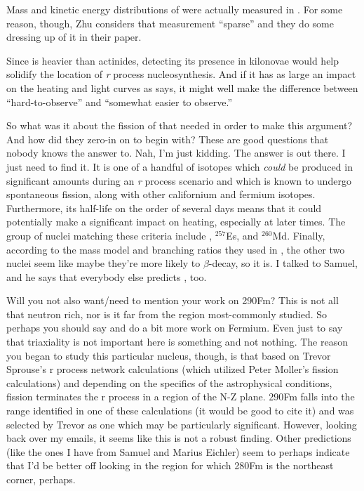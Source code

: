 Mass and kinetic energy distributions of {\Cf} were actually measured in \cite{Brandt1963}. For some reason, though, Zhu considers that measurement ``sparse'' and they do some dressing up of it in their paper.

Since {\Cf} is heavier than actinides, detecting its presence in kilonovae would help solidify the location of \textit{r} process nucleosynthesis. And if it has as large an impact on the heating and light curves as \cite{Zhu2018} says, it might well make the difference between ``hard-to-observe'' and ``somewhat easier to observe.''

So what was it about the fission of {\Cf} that \cite{Zhu2018} needed in order to make this argument? And how did they zero-in on {\Cf} to begin with? These are good questions that nobody knows the answer to. Nah, I'm just kidding. The answer is out there. I just need to find it. It is one of a handful of isotopes which \textit{could} be produced in significant amounts during an \textit{r} process scenario and which is known to undergo spontaneous fission, along with other californium and fermium isotopes. Furthermore, its half-life on the order of several days means that it could potentially make a significant impact on heating, especially at later times. The group of nuclei matching these criteria include {\Cf}, $^{257}$Es, and $^{260}$Md. Finally, according to the mass model and branching ratios they used in \cite{Zhu2018}, the other two nuclei seem like maybe they're more likely to $\beta$-decay, so {\Cf} it is. I talked to Samuel, and he says that everybody else predicts {\Cf}, too.

Will you not also want/need to mention your work on 290Fm? This {\Cf} is not all that neutron rich, nor is it far from the region most-commonly studied. So perhaps you should say and do a bit more work on Fermium. Even just to say that triaxiality is not important here is something and not nothing. The reason you began to study this particular nucleus, though, is that based on Trevor Sprouse's r process network calculations (which utilized Peter Moller's fission calculations) and depending on the specifics of the astrophysical conditions, fission terminates the r process in a region of the N-Z plane. 290Fm falls into the range identified in one of these calculations (it would be good to cite it) and was selected by Trevor as one which may be particularly significant. However, looking back over my emails, it seems like this is not a robust finding. Other predictions (like the ones I have from Samuel and Marius Eichler) seem to perhaps indicate that I'd be better off looking in the region for which 280Fm is the northeast corner, perhaps.